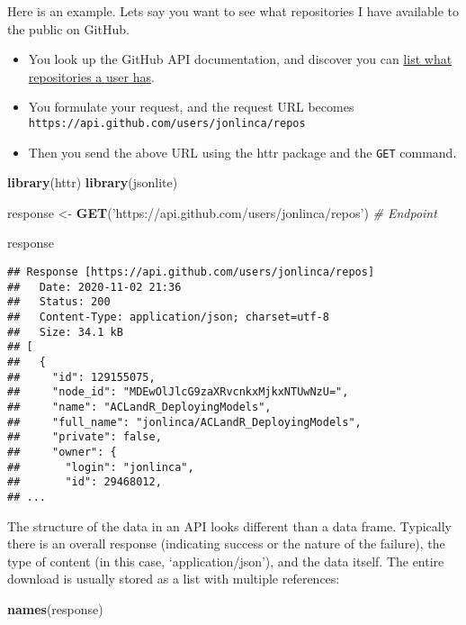 \documentclass[
]{book}
\newenvironment{Shaded}{\begin{snugshade}}{\end{snugshade}}
\newcommand{\CommentTok}[1]{\textcolor[rgb]{0.56,0.35,0.01}{\textit{#1}}}
\newcommand{\KeywordTok}[1]{\textcolor[rgb]{0.13,0.29,0.53}{\textbf{#1}}}
\newcommand{\NormalTok}[1]{#1}
\newcommand{\StringTok}[1]{\textcolor[rgb]{0.31,0.60,0.02}{#1}}
\providecommand{\tightlist}{%
  \setlength{\itemsep}{0pt}\setlength{\parskip}{0pt}}
\begin{document}
Here is an example. Lets say you want to see what repositories I have available to the public on GitHub.

\begin{itemize}
\tightlist
\item
  You look up the GitHub API documentation, and discover you can \href{https://developer.github.com/v3/repos/\#list-repositories-for-a-user}{list what repositories a user has}.
\item
  You formulate your request, and the request URL becomes \texttt{https://api.github.com/users/jonlinca/repos}
\item
  Then you send the above URL using the httr package and the \texttt{GET} command.
\end{itemize}

\begin{Shaded}
\begin{Highlighting}[]
\KeywordTok{library}\NormalTok{(httr)}
\KeywordTok{library}\NormalTok{(jsonlite)}

\NormalTok{response <-}\StringTok{ }\KeywordTok{GET}\NormalTok{(}\StringTok{'https://api.github.com/users/jonlinca/repos'}\NormalTok{) }\CommentTok{# Endpoint}

\NormalTok{response}
\end{Highlighting}
\end{Shaded}

\begin{verbatim}
## Response [https://api.github.com/users/jonlinca/repos]
##   Date: 2020-11-02 21:36
##   Status: 200
##   Content-Type: application/json; charset=utf-8
##   Size: 34.1 kB
## [
##   {
##     "id": 129155075,
##     "node_id": "MDEwOlJlcG9zaXRvcnkxMjkxNTUwNzU=",
##     "name": "ACLandR_DeployingModels",
##     "full_name": "jonlinca/ACLandR_DeployingModels",
##     "private": false,
##     "owner": {
##       "login": "jonlinca",
##       "id": 29468012,
## ...
\end{verbatim}

The structure of the data in an API looks different than a data frame. Typically there is an overall response (indicating success or the nature of the failure), the type of content (in this case, `application/json'), and the data itself. The entire download is usually stored as a list with multiple references:

\begin{Shaded}
\begin{Highlighting}[]
\KeywordTok{names}\NormalTok{(response)}
\end{Highlighting}
\end{Shaded}
\end{document}

